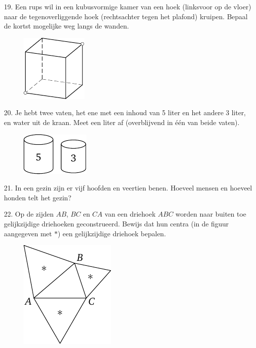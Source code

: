 \begin{problem}{19.}
	Een rups wil in een kubusvormige kamer van een hoek (linksvoor op de vloer) naar de tegenoverliggende hoek (rechtsachter tegen het plafond) kruipen. Bepaal de kortst mogelijke weg langs de wanden.
	\begin{figure}
		\includegraphics{resources/taskbook-3}
	\end{figure}
\end{problem}

\begin{problem}{20.}
	Je hebt twee vaten, het ene met een inhoud van 5 liter en het andere 3 liter, en water uit de kraan. Meet een liter af (overblijvend in één van beide vaten).
	\begin{figure}
		\includegraphics{resources/taskbook-4}
	\end{figure}
\end{problem}

\begin{problem}{21.}
	In een gezin zijn er vijf hoofden en veertien benen. Hoeveel mensen en hoeveel honden telt het gezin?
\end{problem}

\clearpage

\begin{problem}{22.}
	Op de zijden $AB$, $BC$ en $CA$ van een driehoek $ABC$ worden naar buiten toe gelijkzijdige driehoeken geconstrueerd. Bewijs dat hun centra (in de figuur aangegeven met $*$) een gelijkzijdige driehoek bepalen.
	\begin{figure}
		\includegraphics{resources/taskbook-6}
	\end{figure}
\end{problem}

